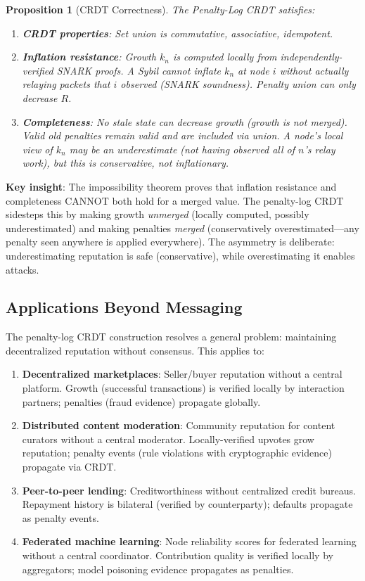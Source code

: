 \documentclass[11pt,a4paper]{article}
\newtheorem{proposition}[theorem]{Proposition}
\begin{document}
\begin{proposition}[CRDT Correctness]
\label{prop:crdt-correct}
The Penalty-Log CRDT satisfies:
\begin{enumerate}[nosep]
    \item \textbf{CRDT properties}: Set union is commutative, associative, idempotent.
    \item \textbf{Inflation resistance}: Growth $k_n$ is computed locally from independently-verified SNARK proofs. A Sybil cannot inflate $k_n$ at node $i$ without actually relaying packets that $i$ observed (SNARK soundness). Penalty union can only decrease $R$.
    \item \textbf{Completeness}: No stale state can decrease growth (growth is not merged). Valid old penalties remain valid and are included via union. A node's local view of $k_n$ may be an underestimate (not having observed all of $n$'s relay work), but this is conservative, not inflationary.
\end{enumerate}
\end{proposition}

\textbf{Key insight}: The impossibility theorem proves that inflation resistance and completeness CANNOT both hold for a merged value. The penalty-log CRDT sidesteps this by making growth \emph{unmerged} (locally computed, possibly underestimated) and making penalties \emph{merged} (conservatively overestimated---any penalty seen anywhere is applied everywhere). The asymmetry is deliberate: underestimating reputation is safe (conservative), while overestimating it enables attacks.

\subsection{Applications Beyond Messaging}
\label{sec:crdt-applications}

The penalty-log CRDT construction resolves a general problem: maintaining decentralized reputation without consensus. This applies to:

\begin{enumerate}[nosep]
    \item \textbf{Decentralized marketplaces}: Seller/buyer reputation without a central platform. Growth (successful transactions) is verified locally by interaction partners; penalties (fraud evidence) propagate globally.
    \item \textbf{Distributed content moderation}: Community reputation for content curators without a central moderator. Locally-verified upvotes grow reputation; penalty events (rule violations with cryptographic evidence) propagate via CRDT.
    \item \textbf{Peer-to-peer lending}: Creditworthiness without centralized credit bureaus. Repayment history is bilateral (verified by counterparty); defaults propagate as penalty events.
    \item \textbf{Federated machine learning}: Node reliability scores for federated learning without a central coordinator. Contribution quality is verified locally by aggregators; model poisoning evidence propagates as penalties.
\end{enumerate}
\end{document}
